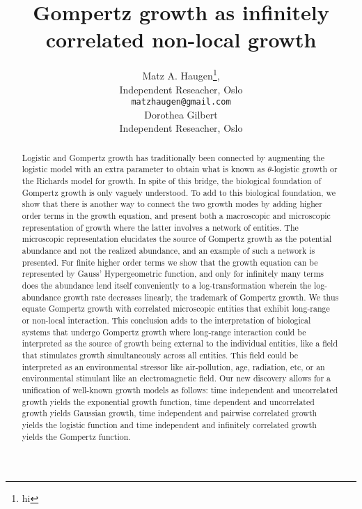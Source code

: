 \documentclass{article}
\title{Gompertz growth as infinitely correlated non-local growth}
\author{Matz A. Haugen\footnote{hi}, \\
Independent Reseacher, Oslo\\
\texttt{matzhaugen@gmail.com} \\
  \And
  Dorothea Gilbert \\
  Independent Reseacher, Oslo\\
}
\begin{document}
\maketitle

\begin{abstract}
Logistic and Gompertz growth has traditionally been connected by augmenting the logistic model with an extra parameter to obtain what is known as $\theta$-logistic growth or the Richards model for growth. In spite of this bridge, the biological foundation of Gompertz growth is only vaguely understood. 
To add to this biological foundation, we show that there is another way to connect the two growth modes by adding higher order terms in the growth equation, and present both a macroscopic and microscopic representation of growth where the latter involves a network of entities. 
The microscopic representation elucidates the source of Gompertz growth as the potential abundance and not the realized abundance, and an example of such a network is presented. 
For finite higher order terms we show that the growth equation can be represented by Gauss' Hypergeometric function, and only for infinitely many terms does the abundance lend itself conveniently to a log-transformation wherein the log-abundance growth rate decreases linearly, the trademark of Gompertz growth. We thus equate Gompertz growth with correlated microscopic entities that exhibit long-range or non-local interaction. 
This conclusion adds to the interpretation of biological systems that undergo Gompertz growth where long-range interaction could be interpreted as the source of growth being external to the individual entities, like a field that stimulates growth simultaneously across all entities. 
This field could be interpreted as an environmental stressor like air-pollution, age, radiation, etc, or an environmental stimulant like an electromagnetic field. 
Our new discovery allows for a unification of well-known growth models as follows: time independent and uncorrelated growth yields the exponential growth function, time dependent and uncorrelated growth yields Gaussian growth, time independent and pairwise correlated growth yields the logistic function and time independent and infinitely correlated growth yields the Gompertz function. 

\end{abstract}

\end{document}
